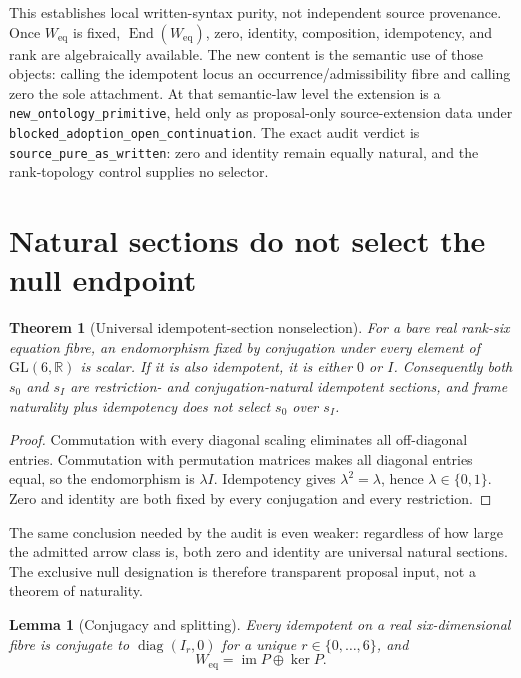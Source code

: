 \documentclass[11pt]{article}
\newtheorem{theorem}{Theorem}
\newtheorem{lemma}{Lemma}
\newcommand{\Weq}{W_{\mathrm{eq}}}
\begin{document}
This establishes local written-syntax purity, not independent source
provenance. Once $\Weq$ is fixed, $\operatorname{End}(\Weq)$, zero, identity,
composition, idempotency, and rank are algebraically available. The new
content is the semantic use of those objects: calling the idempotent locus an
occurrence/admissibility fibre and calling zero the sole attachment. At that
semantic-law level the extension is a \texttt{new\_ontology\_primitive}, held
only as proposal-only source-extension data under
\texttt{blocked\_adoption\_open\_continuation}.
The exact audit verdict is \texttt{source\_pure\_as\_written}: zero and identity
remain equally natural, and the rank-topology control supplies no selector.

\section{Natural sections do not select the null endpoint}

\begin{theorem}[Universal idempotent-section nonselection]
For a bare real rank-six equation fibre, an endomorphism fixed by conjugation
under every element of $\mathrm{GL}(6,\mathbb R)$ is scalar. If it is also
idempotent, it is either $0$ or $I$. Consequently both $s_0$ and $s_I$ are
restriction- and conjugation-natural idempotent sections, and frame naturality
plus idempotency does not select $s_0$ over $s_I$.
\end{theorem}

\begin{proof}
Commutation with every diagonal scaling eliminates all off-diagonal entries.
Commutation with permutation matrices makes all diagonal entries equal, so the
endomorphism is $\lambda I$. Idempotency gives
$\lambda^2=\lambda$, hence $\lambda\in\{0,1\}$. Zero and identity are both
fixed by every conjugation and every restriction.
\end{proof}

The same conclusion needed by the audit is even weaker: regardless of how
large the admitted arrow class is, both zero and identity are universal
natural sections. The exclusive null designation is therefore transparent
proposal input, not a theorem of naturality.

\begin{lemma}[Conjugacy and splitting]
Every idempotent on a real six-dimensional fibre is conjugate to
$\operatorname{diag}(I_r,0)$ for a unique $r\in\{0,\ldots,6\}$, and
\[
 \Weq=\operatorname{im}P\oplus\ker P.
\]
\end{lemma}
\end{document}
